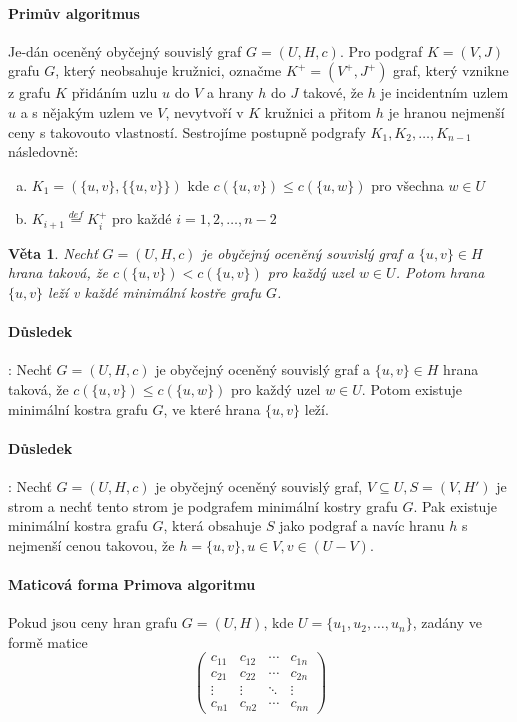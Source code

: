 \documentclass[a4paper, 11pt]{report}
\newtheorem{veta}{Věta}[chapter]
\begin{document}
\paragraph{Primův algoritmus}
Je-dán oceněný obyčejný souvislý graf $G=(U, H, c)$. Pro podgraf $K=(V, J)$ grafu $G$, který neobsahuje kružnici, označme $K^+ = (V^+, J^+)$ graf, který vznikne z grafu $K$ přidáním uzlu $u$ do $V$ a hrany $h$ do $J$ takové, že $h$ je incidentním uzlem $u$ a s nějakým uzlem ve $V$, nevytvoří v $K$ kružnici a přitom $h$ je hranou nejmenší ceny s takovouto vlastností. Sestrojíme postupně podgrafy $K_1, K_2, \dots, K_{n-1}$ následovně:
\begin{enumerate}[(a)]
	\item $K_1 = (\{u, v\}, \{\{u, v\}\})$ kde $c(\{u, v\}) \leq c(\{u, w\})$ pro všechna $w \in U$
	\item $K_{i+1} \overset{def}{=} K^+_i$ pro každé $i = 1, 2, \dots, n-2$
\end{enumerate}


\begin{veta}
Nechť $G = (U, H, c)$ je obyčejný oceněný souvislý graf a $\{u,v\} \in H$ hrana taková, že $c(\{u, v\}) < c(\{u, v\})$ pro každý uzel $w \in U$. Potom hrana $\{u, v\}$ leží v každé minimální kostře grafu $G$.
\end{veta}

\paragraph{Důsledek}: Nechť $G = (U, H, c)$ je obyčejný oceněný souvislý graf a $\{u, v \} \in H$ hrana taková, že $c(\{u, v\}) \leq c(\{u, w\})$ pro každý uzel $w \in U$. Potom existuje minimální kostra grafu $G$, ve které hrana $\{u, v\}$ leží.

\paragraph{Důsledek}: Nechť $G = (U, H, c)$ je obyčejný oceněný souvislý graf, $V \subseteq U, S = (V, H')$ je strom a nechť tento strom je podgrafem minimální kostry grafu $G$. Pak existuje minimální kostra grafu $G$, která obsahuje $S$ jako podgraf a navíc hranu $h$ s nejmenší cenou takovou, že $h = \{u, v\}, u \in V, v \in (U-V)$.

\paragraph{Maticová forma Primova algoritmu}
Pokud jsou ceny hran grafu $G=(U, H)$, kde $U=\{u_1, u_2, \dots, u_n\}$, zadány ve formě matice
$$
 \begin{pmatrix}
  c_{11} & c_{12} & \cdots & c_{1n} \\
  c_{21} & c_{22} & \cdots & c_{2n} \\
  \vdots  & \vdots  & \ddots & \vdots  \\
  c_{n1} & c_{n2} & \cdots & c_{nn} 
 \end{pmatrix}
$$
\end{document}
